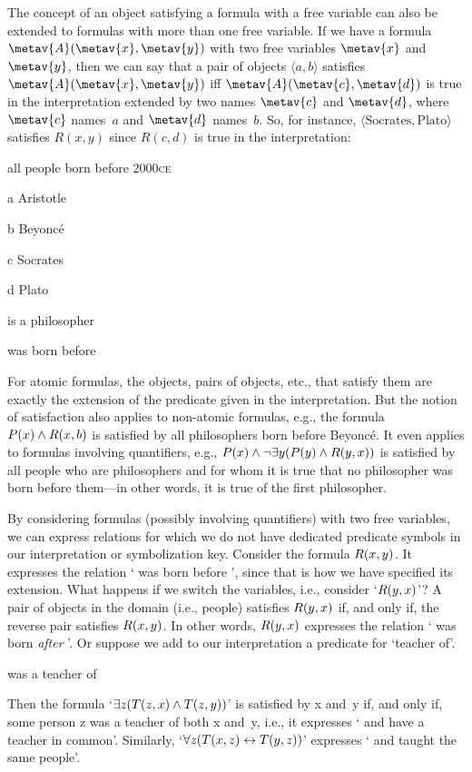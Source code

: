The concept of an object satisfying a formula with a free variable can also be extended to formulas with more than one free variable. If we have a formula $\metav{A}(\metav{x},\metav{y})$ with two free variables $\metav{x}$ and $\metav{y}$, then we can say that a pair of objects $\langle a, b\rangle$ satisfies $\metav{A}(\metav{x},\metav{y})$ iff $\metav{A}(\metav{c},\metav{d})$ is true in the interpretation extended by two names $\metav{c}$ and $\metav{d}$, where $\metav{c}$ names~$a$ and $\metav{d}$ names~$b$. So, for instance, $\langle \text{Socrates}, \text{Plato}\rangle$ satisfies $R(x,y)$ since $R(c,d)$ is true in the interpretation:
\begin{ekey}
	\item[\text{domain}] all people born before 2000\textsc{ce}
	\item[a] Aristotle
	\item[b] Beyonc\'e
	\item[c] Socrates
	\item[d] Plato
	\item[\atom{P}{x}]  is a philosopher
	\item[\atom{R}{x,y}]  was born before 
\end{ekey}
For atomic formulas, the objects, pairs of objects, etc., that satisfy them are exactly the extension of the predicate given in the interpretation. But the notion of satisfaction also applies to non-atomic formulas, e.g., the formula $\mathord{P}(x) \land \mathord{R}(x,b)$ is satisfied by all philosophers born before Beyonc\'e. It even applies to formulas involving quantifiers, e.g., $P(x) \wedge \lnot\exists y(P(y) \land R(y,x))$ is satisfied by all people who are philosophers and for whom it is true that no philosopher was born before them---in other words, it is true of the first philosopher.

By considering formulas (possibly involving quantifiers) with two free
variables, we can express relations for which we do not have dedicated
predicate symbols in our interpretation or symbolization key. Consider
the formula $\mathord{R}(x,y)$. It expresses the relation ` was
born before ', since that is how we have specified its
extension. What happens if we switch the variables, i.e., consider
`$\mathord{R}(y,x)$'?  A pair of objects  in
the domain (i.e., people) satisfies $\mathord{R}(y,x)$ if, and only if,
the reverse pair  satisfies
$\mathord{R}(x,y)$. In other words, $\mathord{R}(y,x)$ expresses the
relation ` was born \emph{after} '. Or suppose we add to
our interpretation a predicate for `teacher of'.
\begin{ekey}
	\item[\atom{T}{x,y}]  was a teacher of 
\end{ekey}
Then the formula `$\exists z(\mathord{T}(z,x) \land \mathord{T}(z,y))$' is
satisfied by x and~y if, and only if, some person z was a teacher of
both x and~y, i.e., it expresses ` and  have a teacher
in common'. Similarly, `$\forall z(\mathord{T}(x,z) \leftrightarrow \mathord{T}(y,
z))$' expresses ` and  taught the same people'.


